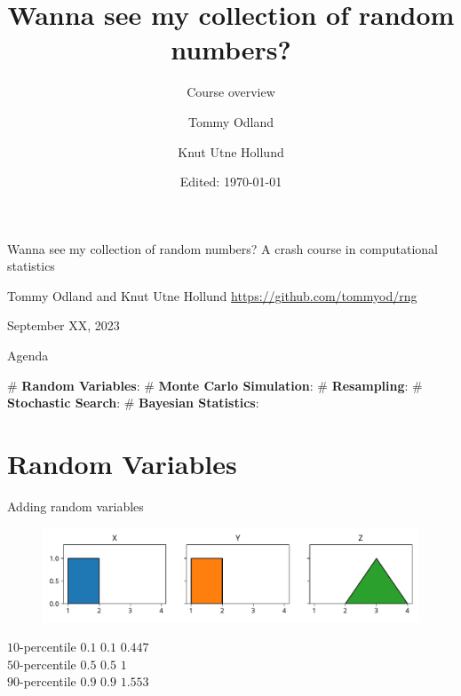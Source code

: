 \documentclass[12pt, aspectratio=149]{beamer}
\institute{Equinor}
\date{Edited: \today}
\author{Tommy Odland \and Knut Utne Hollund}
\title{Wanna see my collection of random numbers?}
\subtitle{Course overview}
\theoremstyle{plain}
\begin{document}
\begin{frame}{}
	\begin{center}
			\vfill
	{\huge Wanna see my collection of random numbers?}
	\vfill
	{\large A crash course in computational statistics}
	\vfill
	

	\vfill
	{\large  Tommy Odland and Knut Utne Hollund}
	\vfill
	{\small \href{https://github.com/tommyod/rng}{https://github.com/tommyod/rng}}

	\vfill
	September XX, 2023
	\vfill
	\end{center}
\end{frame}


\begin{frame}[fragile]{Agenda}
	\begin{center}
	\end{center}
	
	\begin{easylist}[itemize]
		# \textbf{Random Variables}: 
		# \textbf{Monte Carlo Simulation}: 
		# \textbf{Resampling}: 
		# \textbf{Stochastic Search}: 
		# \textbf{Bayesian Statistics}: 
	\end{easylist}
\end{frame}

\section{Random Variables}

\begin{frame}[fragile]{Adding random variables}
    \begin{center}
     \begin{figure}
     	\centering
     	\includegraphics[width=0.99\linewidth]{figures/add_uniform}
     \end{figure}
     \end{center}
     $10$-percentile \hspace*{1em} $0.1$ \hspace*{5em}  $0.1$ \hspace*{7em} $0.447$ \\
     $50$-percentile \hspace*{1em} $0.5$ \hspace*{5em}  $0.5$ \hspace*{7em} $1$ \\
     $90$-percentile \hspace*{1em} $0.9$ \hspace*{5em}  $0.9$ \hspace*{7em} $1.553$
\end{frame}
\end{document}
